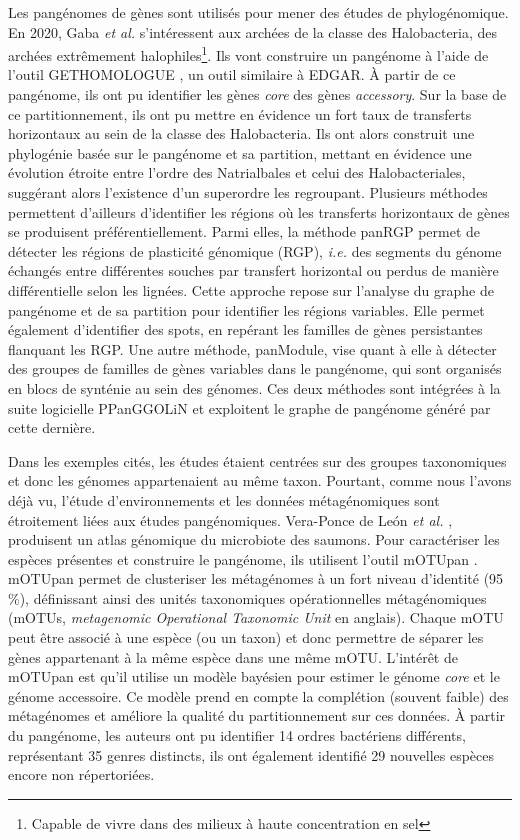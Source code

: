 Les pangénomes de gènes sont utilisés pour mener des études de phylogénomique. En 2020, Gaba \textit{et al.} \cite{gaba_pan-genome_2020} s'intéressent aux archées de la classe des Halobacteria, des archées extrêmement halophiles\footnote{Capable de vivre dans des milieux à haute concentration en sel}. Ils vont construire un pangénome à l'aide de l'outil GET\textunderscore HOMOLOGUE \cite{contreras-moreira_get_homologues_2013}, un outil similaire à EDGAR. À partir de ce pangénome, ils ont pu identifier les gènes \textit{core} des gènes \textit{accessory}. Sur la base de ce partitionnement, ils ont pu mettre en évidence un fort taux de transferts horizontaux au sein de la classe des Halobacteria. Ils ont alors construit une phylogénie basée sur le pangénome et sa partition, mettant en évidence une évolution étroite entre l'ordre des Natrialbales et celui des Halobacteriales, suggérant alors l'existence d'un superordre les regroupant. Plusieurs méthodes permettent d’ailleurs d'identifier les régions où les transferts horizontaux de gènes se produisent préférentiellement. Parmi elles, la méthode panRGP\cite{bazin_panrgp_2020} permet de détecter les régions de plasticité génomique (RGP), \textit{i.e.} des segments du génome échangés entre différentes souches par transfert horizontal ou perdus de manière différentielle selon les lignées. Cette approche repose sur l’analyse du graphe de pangénome et de sa partition pour identifier les régions variables. Elle permet également d’identifier des spots, en repérant les familles de gènes persistantes flanquant les RGP. Une autre méthode, panModule\cite{bazin_panmodule_2021}, vise quant à elle à détecter des groupes de familles de gènes variables dans le pangénome, qui sont organisés en blocs de synténie au sein des génomes. Ces deux méthodes sont intégrées à la suite logicielle PPanGGOLiN et exploitent le graphe de pangénome généré par cette dernière.

Dans les exemples cités, les études étaient centrées sur des groupes taxonomiques et donc les génomes appartenaient au même taxon. Pourtant, comme nous l'avons déjà vu, l'étude d'environnements et les données métagénomiques sont étroitement liées aux études pangénomiques. Vera-Ponce de León \textit{et al.} \cite{vera-ponce_de_leon_genomic_2024}, produisent un atlas génomique du microbiote des saumons. Pour caractériser les espèces présentes et construire le pangénome, ils utilisent l'outil mOTUpan \cite{buck_motupan_2022}. mOTUpan permet de clusteriser les métagénomes à un fort niveau d'identité (95 \%), définissant ainsi des unités taxonomiques opérationnelles métagénomiques (mOTUs, \textit{metagenomic Operational Taxonomic Unit} en anglais). Chaque mOTU peut être associé à une espèce (ou un taxon) et donc permettre de séparer les gènes appartenant à la même espèce dans une même mOTU. L'intérêt de mOTUpan est qu'il utilise un modèle bayésien pour estimer le génome \textit{core} et le génome accessoire. Ce modèle prend en compte la complétion (souvent faible) des métagénomes et améliore la qualité du partitionnement sur ces données. À partir du pangénome, les auteurs ont pu identifier 14 ordres bactériens différents, représentant 35 genres distincts, ils ont également identifié 29 nouvelles espèces encore non répertoriées.

